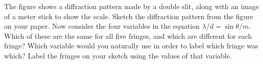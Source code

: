 The figure shows a diffraction pattern made by a double
slit, along with an image of a meter stick to show the
scale. Sketch the diffraction pattern from the figure on your
paper. Now consider the four variables in the equation
$\lambda /d=\sin \theta /m$. Which of these are the same
for all five fringes, and which are different for each
fringe? Which variable would you naturally use in order to
label which fringe was which? Label the fringes on your
sketch using the values of that variable.
